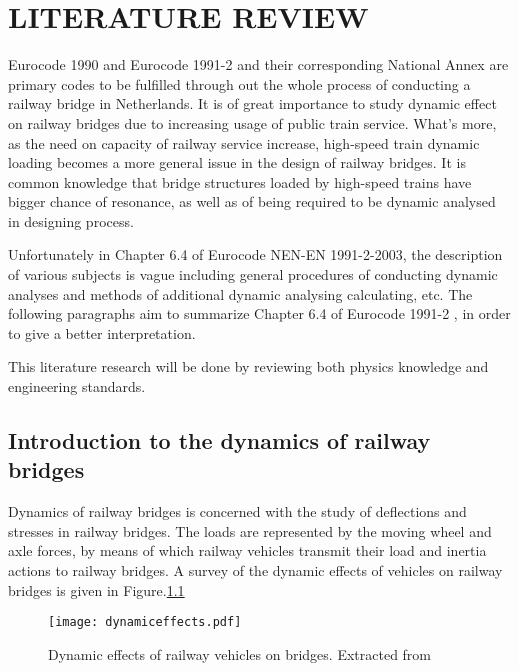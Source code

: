 
\chapter{LITERATURE REVIEW} 
Eurocode 1990 and Eurocode 1991-2 and their corresponding National Annex are primary codes to be fulfilled through out the whole process of conducting a railway bridge in Netherlands. It is of great importance to study dynamic effect on railway bridges due to increasing usage of public train service. What's more, as the need on capacity of railway service increase, high-speed train dynamic loading becomes a more general issue in the design of railway bridges. It is common knowledge that bridge structures loaded by high-speed trains have bigger chance of resonance, as well as of being required to be dynamic analysed in designing process. 

Unfortunately in Chapter 6.4 of Eurocode NEN-EN 1991-2-2003, the description of various subjects is vague including general procedures of conducting dynamic analyses and methods of additional dynamic analysing calculating, etc. The following paragraphs aim to summarize Chapter 6.4 of Eurocode 1991-2 \cite{EC12}, in order to give a better interpretation. 

This literature research will be done by reviewing both physics knowledge and engineering standards.

\section{Introduction to the dynamics of railway bridges}

\cite{fryba1996dynamics}Dynamics of railway bridges is concerned with the study of deflections and stresses in railway bridges. The loads are represented by the moving wheel and axle forces, by means of which railway vehicles transmit their load and inertia actions to railway bridges. A survey of the dynamic effects of vehicles on railway bridges is given in Figure.\ref{fig:dynamic effects}

\begin{figure}[h]
	\centering
	\texttt{[image: dynamiceffects.pdf]}
	\caption{Dynamic effects of railway vehicles on bridges. Extracted from \cite[1.1]{fryba1996dynamics} }
	\label{fig:dynamic effects}
\end{figure}

